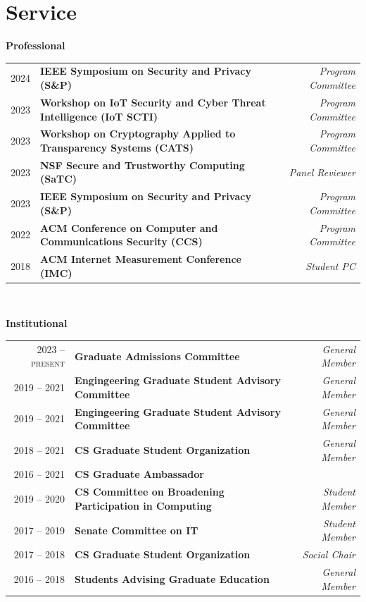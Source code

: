 \documentclass[10pt,singlecolumn]{article} %
\begin{document}

\section{Service}

\textbf{Professional}\\

\begin{tabular}{rlr}
2024 & \textbf{IEEE Symposium on Security and Privacy (S\&P)} & \emph{Program Committee} \\ 
2023 & \textbf{Workshop on IoT Security and Cyber Threat Intelligence (IoT SCTI)} & \emph{Program Committee} \\
2023 & \textbf{Workshop on Cryptography Applied to Transparency Systems (CATS)} & \emph{Program Committee} \\ 
2023 & \textbf{NSF Secure and Trustworthy Computing (SaTC)} & \emph{Panel Reviewer} \\
2023 & \textbf{IEEE Symposium on Security and Privacy (S\&P)} & \emph{Program Committee} \\ 
2022 & \textbf{ACM Conference on Computer and Communications Security (CCS)} & \emph{Program Committee} \\
2018 & \textbf{ACM Internet Measurement Conference (IMC)} & \emph{Student PC} \\
\end{tabular} \\



\vspace{0.3cm}

\textbf{Institutional}\\

\begin{tabular}{rlr}
2023 -- \textsc{present} & \textbf{Graduate Admissions Committee} & \emph{General Member} \\
2019 -- 2021 & \textbf{Engingeering Graduate Student Advisory Committee} & \emph{General Member} \\
2019 -- 2021 & \textbf{Engingeering Graduate Student Advisory Committee} & \emph{General Member} \\
2018 -- 2021 & \textbf{CS Graduate Student Organization} & \emph{General Member} \\
2016 -- 2021 & \textbf{CS Graduate Ambassador}\\
2019 -- 2020 & \textbf{CS Committee on Broadening Participation in Computing}  & \emph{Student Member} \\
2017 -- 2019 & \textbf{Senate Committee on IT}  & \emph{Student Member} \\
2017 -- 2018 & \textbf{CS Graduate Student Organization} & \emph{Social Chair} \\
2016 -- 2018 & \textbf{Students Advising Graduate Education} & \emph{General Member} \\
\end{tabular} \\
\end{document}
